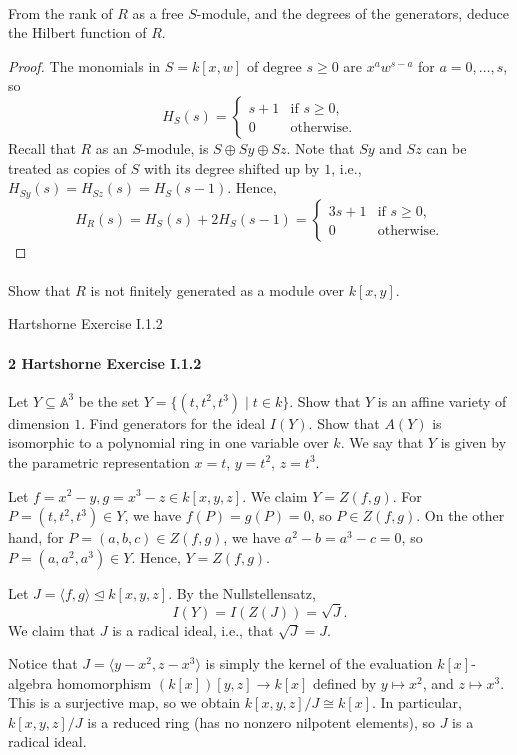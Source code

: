 \documentclass[12pt]{article}
\newlength{\myparskip}
\newenvironment{fullbox}{\begin{lrbox}{\savefullbox}\begin{minipage}{\dimexpr\textwidth-2\fboxsep\relax}\setlength{\parskip}{\myparskip}}{\end{minipage}\end{lrbox}\framebox[\textwidth]{\usebox{\savefullbox}}}
\newenvironment{pbox}[1][]{\begin{fullbox}\ifx#1\empty\else\paragraph{#1}\fi}{\end{fullbox}}
\newcommand{\<}{\langle}
\renewcommand{\>}{\rangle}
\newcommand{\isom}{\cong}
\newcommand{\teq}{\trianglelefteq}
\newcommand{\A}{\mathbb{A}}
\newcommand{\rad}{\sqrt}
\begin{document}
\begin{pbox}
    From the rank of $R$ as a free $S$-module, and the degrees of the generators, deduce the Hilbert function of $R$.
\end{pbox}

\begin{proof}
    The monomials in $S= k[x, w]$ of degree $s \geq 0$ are $x^aw^{s-a}$ for $a = 0, \dots, s$, so
    \[
        H_S(s) = \begin{cases}
            s + 1 &\text{if } s \geq 0, \\
            0 &\text{otherwise}.
        \end{cases}
    \]
    Recall that $R$ as an $S$-module, is $S \oplus Sy \oplus Sz$. Note that $Sy$ and $Sz$ can be treated as copies of $S$ with its degree shifted up by $1$, i.e., $H_{Sy}(s) = H_{Sz}(s) = H_S(s - 1)$. Hence,
    \[
        H_R(s) = H_S(s) + 2H_S(s - 1) = \begin{cases}
            3s + 1 &\text{if } s \geq 0, \\
            0 &\text{otherwise}.
        \end{cases}
    \]

\end{proof}

\begin{pbox}
    Show that $R$ is not finitely generated as a module over $k[x, y]$.
\end{pbox}


\newpage
\begin{pbox}[2 Hartshorne Exercise I.1.2]
    Let $Y \subseteq \A^3$ be the set $Y = \{(t, t^2, t^3) \mid t \in k\}$. Show that $Y$ is an affine variety of dimension $1$. Find generators for the ideal $I(Y)$. Show that $A(Y)$ is isomorphic to a polynomial ring in one variable over $k$. We say that $Y$ is given by the parametric representation $x = t$, $y = t^2$, $z = t^3$.
\end{pbox}

Let $f = x^2 - y, g = x^3 - z \in k[x, y, z]$. We claim $Y = Z(f, g)$. For $P = (t, t^2, t^3) \in Y$, we have $f(P) = g(P) = 0$, so $P \in Z(f, g)$. On the other hand, for $P = (a, b, c) \in Z(f, g)$, we have $a^2 - b = a^3 - c = 0$, so $P = (a, a^2, a^3) \in Y$. Hence, $Y = Z(f, g)$.

Let $J = \<f, g\> \teq k[x, y, z]$. By the Nullstellensatz,
\[
    I(Y) = I(Z(J)) = \rad{J}.
\]
We claim that $J$ is a radical ideal, i.e., that $\rad{J} = J$.

Notice that $J = \<y - x^2, z - x^3\>$ is simply the kernel of the evaluation $k[x]$-algebra homomorphism $(k[x])[y, z] \to k[x]$ defined by $y \mapsto x^2$, and $z \mapsto x^3$. This is a surjective map, so  we obtain $k[x, y, z]/J \isom k[x]$. In particular, $k[x, y, z]/J$ is a reduced ring (has no nonzero nilpotent elements), so $J$ is a radical ideal.
\end{document}
